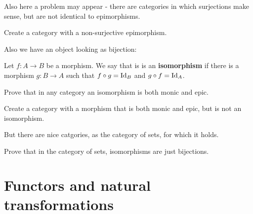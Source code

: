 Also here a problem may appear - there are categories in which surjections make sense, but are not identical to epimorphisms.

\begin{exercise}
  Create a category with a non-surjective epimorphism.
\end{exercise}

Also we have an object looking as bijection:

\begin{definition}
  Let $f: A\to B$ be a morphism. We say that is is an \textbf{isomorphism} if there is a morphism $g:B\to A$ such that $f\circ g=\text{Id}_B$ and $g\circ f=\text{Id}_A$.
\end{definition}

\begin{exercise}
  Prove that in any category an isomorphism is both monic and epic.
\end{exercise}

\begin{exercise}
  Create a category with a morphism that is both monic and epic, but is not an isomorphism.
\end{exercise}

But there are nice catgories, as the category of sets, for which it holds.

\begin{exercise}
  Prove that in the category of sets, isomorphisms are just bijections.
\end{exercise}

\section{Functors and natural transformations}
